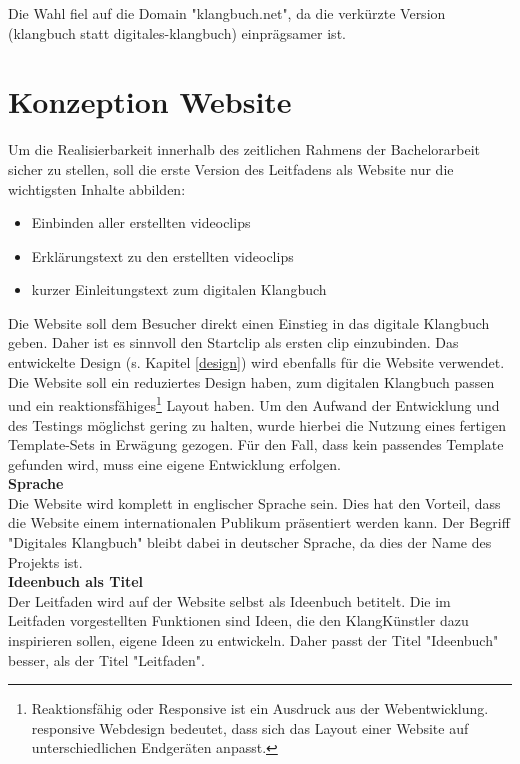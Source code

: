 Die Wahl fiel auf die Domain "klangbuch.net", da die verkürzte Version (klangbuch statt digitales-klangbuch) einprägsamer ist. 



\section{Konzeption Website}
Um die Realisierbarkeit innerhalb des zeitlichen Rahmens der Bachelorarbeit sicher zu stellen, soll die erste Version des Leitfadens als Website nur die wichtigsten Inhalte abbilden:

\begin{itemize}
\item Einbinden aller erstellten \gls{videoclip}s
\item Erklärungstext zu den erstellten \gls{videoclip}s
\item kurzer Einleitungstext zum digitalen Klangbuch
\end{itemize}

Die Website soll dem Besucher direkt einen Einstieg in das digitale Klangbuch geben. Daher ist es sinnvoll den Startclip als ersten \gls{clip} einzubinden. Das entwickelte Design (s. Kapitel \ref{design}) wird ebenfalls für die Website verwendet. Die Website soll ein reduziertes Design haben, zum digitalen Klangbuch passen und ein reaktionsfähiges\footnote{Reaktionsfähig oder Responsive ist ein Ausdruck aus der Webentwicklung. \gls{responsive} Webdesign bedeutet, dass sich das Layout einer Website auf unterschiedlichen Endgeräten anpasst.} Layout haben. Um den Aufwand der Entwicklung und des Testings möglichst gering zu halten, wurde hierbei die Nutzung eines fertigen Template-Sets in Erwägung gezogen. Für den Fall, dass kein passendes Template gefunden wird, muss eine eigene Entwicklung erfolgen.\\

\textbf{Sprache}\\
Die Website wird komplett in englischer Sprache sein. Dies hat den Vorteil, dass die Website einem internationalen Publikum präsentiert werden kann. Der Begriff "Digitales Klangbuch" bleibt dabei in deutscher Sprache, da dies der Name des Projekts ist.\\

\textbf{Ideenbuch als Titel}\\
Der Leitfaden wird auf der Website selbst als Ideenbuch betitelt. Die im Leitfaden vorgestellten Funktionen sind Ideen, die den KlangKünstler dazu inspirieren sollen, eigene Ideen zu entwickeln. Daher passt der Titel "Ideenbuch" besser, als der Titel "Leitfaden".



